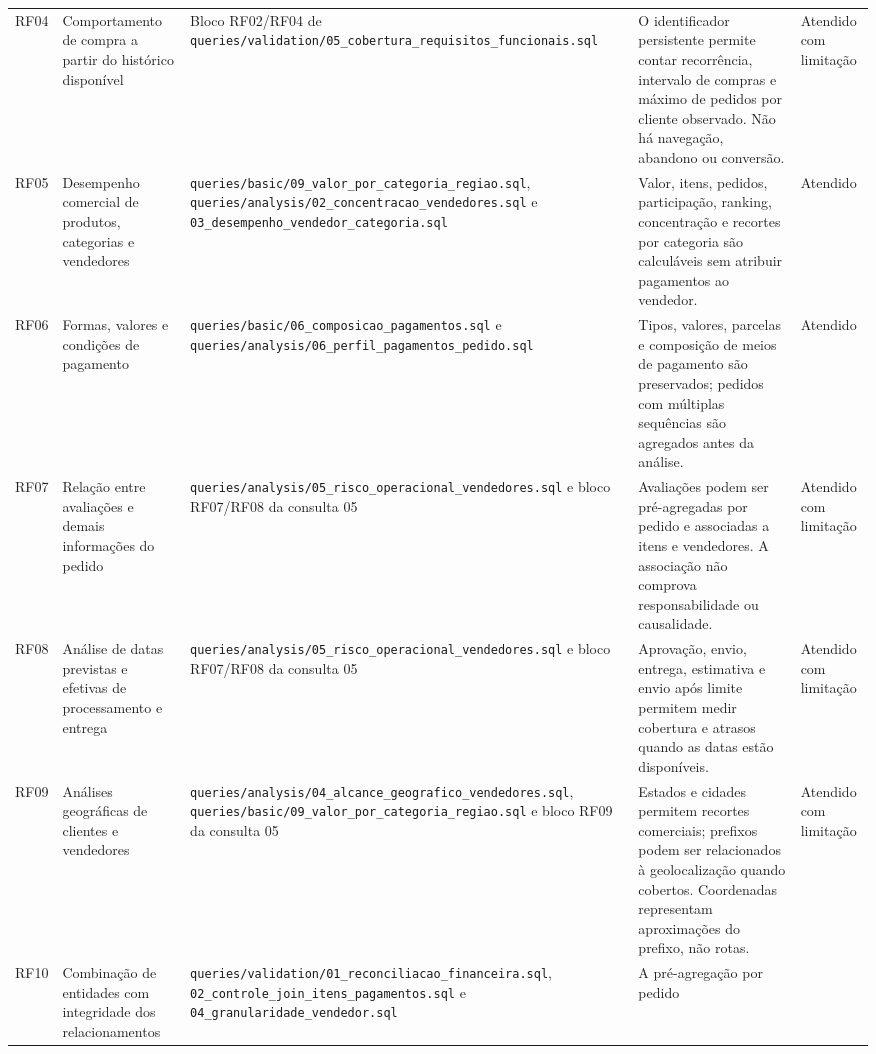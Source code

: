 \documentclass[12pt,a4paper]{article}
\begin{document}
\begin{landscape}
{\begin{longtable}{|>{\RaggedRight\arraybackslash}p{1.7cm}|>{\RaggedRight\arraybackslash}p{4.1cm}|>{\RaggedRight\arraybackslash}p{5.3cm}|>{\RaggedRight\arraybackslash}p{9.7cm}|>{\RaggedRight\arraybackslash}p{2.6cm}|}
RF04 & Comportamento de compra a partir do histórico disponível & Bloco
RF02/RF04 de
\nolinkurl{queries/validation/05_cobertura_requisitos_funcionais.sql} &
O identificador persistente permite contar recorrência, intervalo de
compras e máximo de pedidos por cliente observado. Não há navegação,
abandono ou conversão. & Atendido com limitação \\
RF05 & Desempenho comercial de produtos, categorias e vendedores &
\nolinkurl{queries/basic/09_valor_por_categoria_regiao.sql},
\nolinkurl{queries/analysis/02_concentracao_vendedores.sql} e
\nolinkurl{03_desempenho_vendedor_categoria.sql} & Valor, itens,
pedidos, participação, ranking, concentração e recortes por categoria
são calculáveis sem atribuir pagamentos ao vendedor. & Atendido \\
RF06 & Formas, valores e condições de pagamento &
\nolinkurl{queries/basic/06_composicao_pagamentos.sql} e
\nolinkurl{queries/analysis/06_perfil_pagamentos_pedido.sql} & Tipos,
valores, parcelas e composição de meios de pagamento são preservados;
pedidos com múltiplas sequências são agregados antes da análise. &
Atendido \\
RF07 & Relação entre avaliações e demais informações do pedido &
\nolinkurl{queries/analysis/05_risco_operacional_vendedores.sql} e bloco
RF07/RF08 da consulta 05 & Avaliações podem ser pré-agregadas por pedido
e associadas a itens e vendedores. A associação não comprova
responsabilidade ou causalidade. & Atendido com limitação \\
RF08 & Análise de datas previstas e efetivas de processamento e entrega
& \nolinkurl{queries/analysis/05_risco_operacional_vendedores.sql} e
bloco RF07/RF08 da consulta 05 & Aprovação, envio, entrega, estimativa e
envio após limite permitem medir cobertura e atrasos quando as datas
estão disponíveis. & Atendido com limitação \\
RF09 & Análises geográficas de clientes e vendedores &
\nolinkurl{queries/analysis/04_alcance_geografico_vendedores.sql},
\nolinkurl{queries/basic/09_valor_por_categoria_regiao.sql} e bloco RF09
da consulta 05 & Estados e cidades permitem recortes comerciais;
prefixos podem ser relacionados à geolocalização quando cobertos.
Coordenadas representam aproximações do prefixo, não rotas. & Atendido
com limitação \\
RF10 & Combinação de entidades com integridade dos relacionamentos &
\nolinkurl{queries/validation/01_reconciliacao_financeira.sql},
\nolinkurl{02_controle_join_itens_pagamentos.sql} e
\nolinkurl{04_granularidade_vendedor.sql} & A pré-agregação por pedido

\end{longtable}}
\end{landscape}
\end{document}
